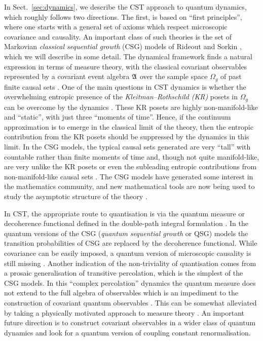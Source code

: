 In Sect.~\ref{sec:dynamics}, we describe the CST approach to quantum
dynamics, which roughly follows two directions.
The first, is based on ``first principles'', where one starts with a general set of
axioms which respect microscopic covariance and causality. An important
class of such theories is the set of Markovian \emph{classical sequential growth} (CSG)  models of Rideout and Sorkin
\citep{csg,csgtwo,csgrg,davidthesis,rv}, which we will describe in some detail. The dynamical framework finds a natural
expression in terms of measure theory,
with the classical covariant observables represented by a covariant event algebra $\mathfrak A$ over the sample space $\Omega_g$ of past finite
causal sets \citep{observables,observablesds}. One of the main questions in CST dynamics is whether the overwhelming entropic
presence of the \emph{Kleitman--Rothschild (KR)} posets in $\Omega_g$ can be overcome by the dynamics \citep{kr}. These KR posets are
highly  non-manifold-like and ``static'', with just three ``moments of time''. Hence, if the continuum approximation is
to emerge in the classical limit of the theory, then the entropic contribution  from the KR posets should be suppressed
by the dynamics in this limit.  In the CSG models, 
the typical causal sets generated are  very ``tall'' with countable rather than finite moments  of time and, though not
quite manifold-like, are very
unlike the KR posets or even the subleading entropic contributions from non-manifold-like causal sets
\cite{dharone,dhartwo}.
The CSG models have generated some interest in the mathematics community, and new mathematical tools are now being used
to study the asymptotic structure of the theory \citep{grnick,gmone,gmtwo,grahammalwina}. 


In CST, the appropriate route to quantisation is via the quantum measure or decoherence functional defined
in the double-path integral formulation \citep{qmeasureone,qmeasuretwo,sorkinqmeasure}. In the quantum versions of the
CSG (\emph{quantum sequential growth} or QSG) models the transition probabilities of CSG are replaced
by the decoherence functional. While
covariance can be easily imposed, a quantum version of microscopic causality is still missing \citep{joecausality}.
Another indication of the non-triviality of quantisation comes from a prosaic 
generalisation of transitive percolation, which is the simplest of the CSG models. In this ``complex percolation''  
dynamics the quantum measure does not
extend to the full algebra of observables which is an impediment to the construction of 
covariant quantum observables \citep{djs}. This can  be somewhat alleviated by taking a physically motivated approach to
measure theory \citep{ec}. An important future direction is to
construct  covariant observables in a wider class of quantum dynamics and look for a quantum version of coupling
constant renormalisation.   

